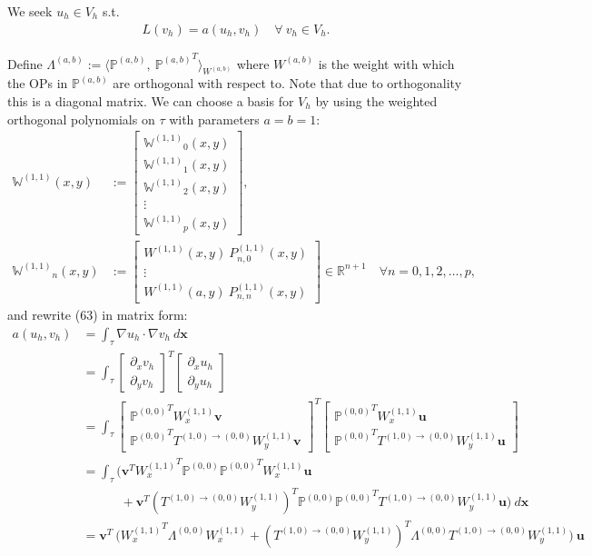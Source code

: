 \documentclass[11pt, oneside]{article}   	%
\newcommand{\R}{\mathbb{R}}
\newcommand{\bigP}{\mathbb{P}}
\newcommand{\Wii}{W^{(1,1)}}
\newcommand{\Pii}{P^{(1,1)}}
\newcommand{\bigPoo}{{\mathbb{P}^{(0,0)}}}
\newcommand{\element}{\tau}
\newcommand{\bigWii}{{\mathbb{W}^{(1,1)}}}
\begin{document}
We seek $u_h \in V_h$ s.t.
\begin{align}
	L(v_h) = a(u_h,v_h) \quad \forall \: v_h \in V_h.
\end{align}

Define $\Lambda^{(a,b)} := \langle \bigP^{(a,b)}, \: {\bigP^{(a,b)}}^T \rangle_{W^{(a,b)}}$ where $W^{(a,b)}$ is the weight with which the OPs in $\bigP^{(a,b)}$ are orthogonal with respect to. Note that due to orthogonality this is a diagonal matrix. We can choose a basis for $V_h$ by using the weighted orthogonal polynomials on $\element$ with parameters $a = b = 1$:
\begin{align}
\bigWii(x,y) &:= \begin{bmatrix}
		\bigWii_0(x,y) \\
		\bigWii_1(x,y) \\
		\bigWii_2(x,y) \\
		\vdots \\
		\bigWii_p(x,y)
	\end{bmatrix}, \\
\bigWii_n(x,y) &:= \begin{bmatrix}
		\Wii(x,y) \: \Pii_{n,0}(x,y) \\
		\vdots \\
		\Wii(a,y) \: \Pii_{n,n}(x,y)
	\end{bmatrix} \in \R^{n+1} \quad \forall n = 0,1,2,\dots,p,
\end{align}
and rewrite (63) in matrix form:
\begin{align}
	a(u_h,v_h) &= \int_\element \nabla u_h \cdot \nabla v_h \: d\mathbf{x} \\
	&= \int_\element \begin{bmatrix}
					\partial_x v_h \\
					\partial_y v_h
				\end{bmatrix}^T 
				\begin{bmatrix}
					\partial_x u_h \\
					\partial_y u_h
				\end{bmatrix}
				\\
	&= \int_\element \begin{bmatrix}
					\bigPoo^T \Wii_x \mathbf{v} \\
					\bigPoo^T T^{(1,0)\to(0,0)} \Wii_y \mathbf{v}
				\end{bmatrix}^T 
				\begin{bmatrix}
					\bigPoo^T \Wii_x \mathbf{u} \\
					\bigPoo^T T^{(1,0)\to(0,0)} \Wii_y \mathbf{u}
				\end{bmatrix}
				\\
	&= \int_\element \Big( \mathbf{v}^T {\Wii_x}^T \bigPoo \bigPoo^T \Wii_x \mathbf{u} \nonumber \\
					& \quad \quad \quad + \mathbf{v}^T ({T^{(1,0)\to(0,0)} \Wii_y})^T \bigPoo \bigPoo^T T^{(1,0)\to(0,0)} \Wii_y \mathbf{u}  \Big) \: d\mathbf{x} \\
	&= \mathbf{v}^T \: \Big( {\Wii_x}^T \Lambda^{(0,0)} \Wii_x + ({T^{(1,0)\to(0,0)} \Wii_y})^T \Lambda^{(0,0)} T^{(1,0)\to(0,0)} \Wii_y \Big) \: \mathbf{u}
\end{align}
\end{document}
